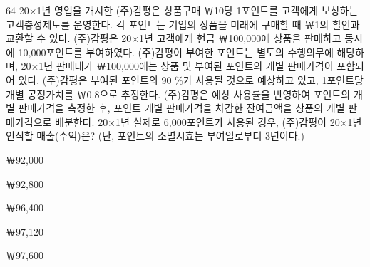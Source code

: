 \begin{question}{64}
20×1년 영업을 개시한 (주)감평은 상품구매 ￦10당 1포인트를 고객에게 보상하는 고객충성제도를 운영한다. 각 포인트는 기업의 상품을 미래에 구매할 때 ￦1의 할인과 교환할 수 있다. (주)감평은 20×1년 고객에게 현금 ￦100,000에 상품을 판매하고 동시에 10,000포인트를 부여하였다. (주)감평이 부여한 포인트는 별도의 수행의무에 해당하며, 20×1년 판매대가 ￦100,000에는 상품 및 부여된 포인트의 개별 판매가격이 포함되어 있다. (주)감평은 부여된 포인트의 90 \%가 사용될 것으로 예상하고 있고, 1포인트당 개별 공정가치를 ￦0.8으로 추정한다. (주)감평은 예상 사용률을 반영하여 포인트의 개별 판매가격을 측정한 후, 포인트 개별 판매가격을 차감한 잔여금액을 상품의 개별 판매가격으로 배분한다. 20×1년 실제로 6,000포인트가 사용된 경우, (주)감평이 20×1년 인식할 매출(수익)은? (단, 포인트의 소멸시효는 부여일로부터 3년이다.)
\begin{choices}
  \item ￦92,000
  \item ￦92,800
  \item ￦96,400
  \item ￦97,120
  \item ￦97,600
\end{choices}
\end{question}
